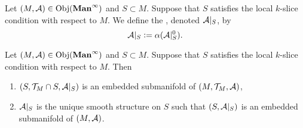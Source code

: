 \documentclass{book}
\begin{document}
	\begin{defn}
			Let $(M, \mathcal{A}) \in \operatorname{Obj}(\operatorname*{\text{\textbf{Man}}^{\infty}})$ and $S \subset M$. Suppose that $S$ satisfies the local $k$-slice condition with respect to $M$. We define the , denoted $\mathcal{A}|_S$, by 
			$$\mathcal{A}|_S \vcentcolon= \alpha(\mathcal{A}|_S^0).$$
	\end{defn}
	
	\begin{ex}
		Let $(M, \mathcal{A}) \in \operatorname{Obj}(\operatorname*{\text{\textbf{Man}}^{\infty}})$ and $S \subset M$. Suppose that $S$ satisfies the local $k$-slice condition with respect to $M$. Then 
		\begin{enumerate}
			\item $(S, \mathcal{T}_M \cap S, \mathcal{A}|_S)$ is an embedded submanifold of $(M, \mathcal{T}_M, \mathcal{A})$,
			\item $\mathcal{A}|_S$ is the unique smooth structure on $S$ such that $(S, \mathcal{A}|_S)$ is an embedded submanifold of $(M, \mathcal{A})$. 
		\end{enumerate}		
	\end{ex}
\end{document}
